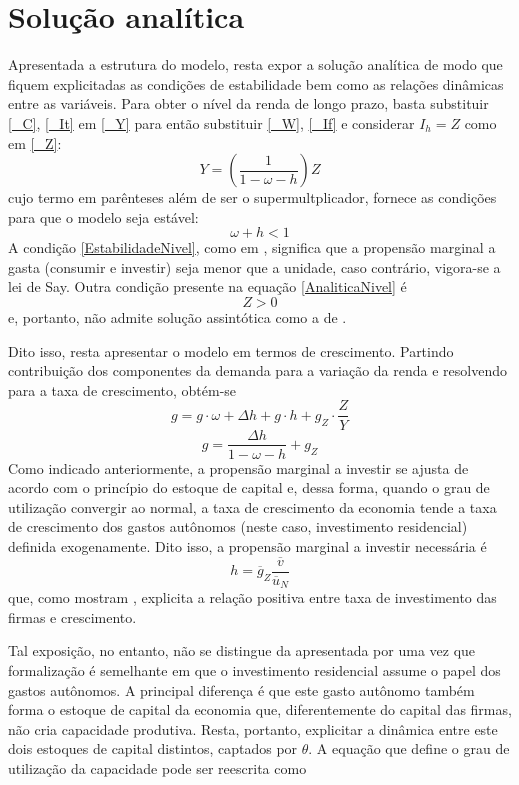 \section{Solução analítica}
\label{SecAnalitica}

Apresentada a estrutura do modelo, resta expor a solução analítica de modo que fiquem explicitadas as condições de estabilidade bem como as relações dinâmicas entre as variáveis. Para obter o nível da renda de longo prazo, basta substituir \ref{_C}, \ref{_It} em \ref{_Y} para então substituir \ref{_W}, \ref{_If} e considerar $I_h = Z$ como em \ref{_Z}:
\begin{equation}
    \label{AnaliticaNivel}
    Y = \left(\frac{1}{1-\omega - h}\right)Z
\end{equation}
cujo termo em parênteses além de ser o supermultplicador, fornece as condições para que o modelo seja estável:
\begin{equation}
    \label{EstabilidadeNivel}
     \omega + h < 1
\end{equation}
A condição \ref{EstabilidadeNivel}, como em \textcite{freitas_growth_2015}, significa que a propensão marginal a gasta (consumir e investir) seja menor que a unidade, caso contrário, vigora-se a lei de Say. Outra condição presente na equação \ref{AnaliticaNivel} é
$$
Z > 0
$$
e, portanto, não admite solução assintótica como a de \textcite{allain_macroeconomic_2014}.

Dito isso, resta apresentar o modelo em termos de crescimento. Partindo contribuição dos componentes da demanda para a variação da renda e resolvendo para a taxa de crescimento, obtém-se
$$
g = g\cdot \omega + \Delta h + g\cdot h + g_Z\cdot \frac{Z}{Y}
$$
\begin{equation}
    g = \frac{\Delta h}{1 - \omega - h} + g_Z
\end{equation}
Como indicado anteriormente, a propensão marginal a investir se ajusta de acordo com o princípio do estoque de capital e, dessa forma, quando o grau de utilização convergir ao normal, a taxa de crescimento da economia tende a taxa de crescimento dos gastos autônomos (neste caso, investimento residencial) definida exogenamente. Dito isso, a propensão marginal a investir necessária é
$$
h = \overline g_Z\frac{\overline v}{\overline u_N}
$$
que, como mostram \textcite{fagundes_role_2017}, explicita a relação positiva entre taxa de investimento das firmas e crescimento. 


Tal exposição, no entanto, não se distingue da apresentada por \textcite{freitas_growth_2015} uma vez que formalização é semelhante em que o investimento residencial assume o papel dos gastos autônomos. A principal diferença é que este gasto autônomo também forma o estoque de capital da economia que, diferentemente do capital das firmas, não cria capacidade produtiva. Resta, portanto, explicitar a dinâmica entre este dois estoques de capital distintos, captados por $\theta$. A equação que define o grau de utilização da capacidade pode ser reescrita como

